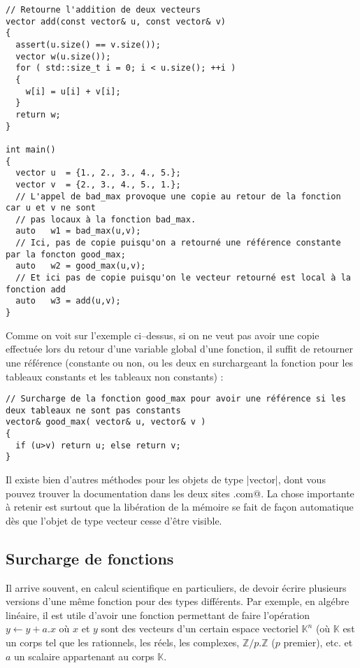 \begin{itemize}
\begin{lstlisting}[caption=retour d'une variable de type vector]
// Retourne l'addition de deux vecteurs
vector add(const vector& u, const vector& v)
{
  assert(u.size() == v.size());
  vector w(u.size());
  for ( std::size_t i = 0; i < u.size(); ++i )
  {
    w[i] = u[i] + v[i];
  }
  return w;
}

int main()
{
  vector u  = {1., 2., 3., 4., 5.};
  vector v  = {2., 3., 4., 5., 1.};
  // L'appel de bad_max provoque une copie au retour de la fonction car u et v ne sont
  // pas locaux à la fonction bad_max.
  auto   w1 = bad_max(u,v);
  // Ici, pas de copie puisqu'on a retourné une référence constante par la foncton good_max;
  auto   w2 = good_max(u,v);
  // Et ici pas de copie puisqu'on le vecteur retourné est local à la fonction add
  auto   w3 = add(u,v);
}
\end{lstlisting}

Comme on voit sur l'exemple ci--dessus, si on ne veut pas avoir une copie effectuée lors du retour d'une variable global d'une fonction, il suffit de retourner une référence (constante ou non, ou les deux en surchargeant la fonction pour les tableaux constants et les tableaux non constants) :

\begin{lstlisting}
// Surcharge de la fonction good_max pour avoir une référence si les deux tableaux ne sont pas constants
vector& good_max( vector& u, vector& v )
{
  if (u>v) return u; else return v;
}
\end{lstlisting}


Il existe bien d'autres méthodes pour les objets de type |vector|, dont vous pouvez trouver la documentation dans les deux sites  \verb@cppreference@et \verb@cplusplus.com@. La chose importante à retenir est surtout que la libération de la mémoire se fait de façon automatique dès que l'objet de type vecteur cesse d'être visible.


\subsection{Surcharge de fonctions}

Il arrive souvent, en calcul scientifique en particuliers, de devoir écrire plusieurs versions d'une même fonction pour des types différents. Par exemple, en algébre linéaire, il est utile d'avoir une fonction permettant de faire l'opération $y\leftarrow y + a.x$
où $x$ et $y$ sont des vecteurs d'un certain espace vectoriel $\mathbb{K}^{n}$ (où
$\mathbb{K}$ est un corps tel que les rationnels, les réels, les complexes,
$\mathbb{Z}/p.\mathbb{Z}$ ($p$ premier), etc. et $a$ un scalaire appartenant au corps 
$\mathbb{K}$.


\end{itemize}
